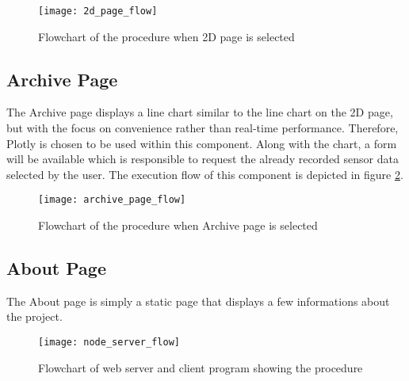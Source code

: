\begin{figure}[H]
    \centering
    \texttt{[image: 2d\_page\_flow]}
    \caption{Flowchart of the procedure when 2D page is selected}
    \label{fig:2d-page-flow}
\end{figure}

\subsection{Archive Page}
The Archive page displays a line chart similar to the line chart on the 2D page, but with the focus on convenience rather than real-time performance. Therefore, Plotly is chosen to be used within this component. Along with the chart, a form will be available which is responsible to request the already recorded sensor data selected by the user. The execution flow of this component is depicted in figure \ref{fig:archive-page-flow}.

\begin{figure}[h]
    \centering
    \texttt{[image: archive\_page\_flow]}
    \caption{Flowchart of the procedure when Archive page is selected}
    \label{fig:archive-page-flow}
\end{figure}

\subsection{About Page}
The About page is simply a static page that displays a few informations about the project.


\begin{figure}[h]
    \centering
    \texttt{[image: node\_server\_flow]}
    \caption{Flowchart of web server and client program showing the procedure}
    \label{fig:webserver-program-flow}
\end{figure}

